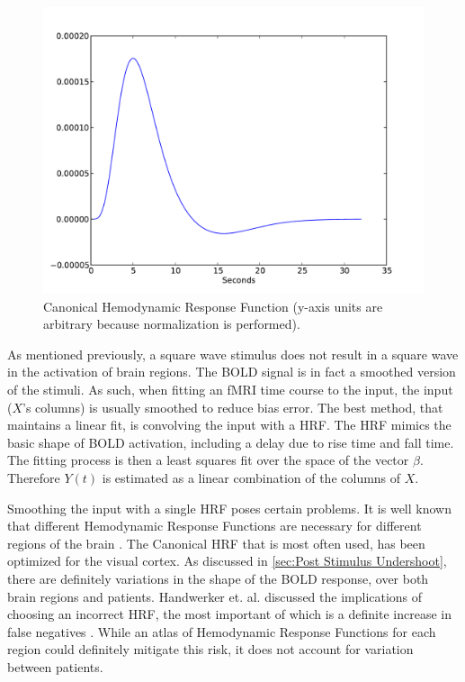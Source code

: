 \begin{figure}
\centering
\includegraphics[scale=.7]{images/HRF}
\caption{Canonical Hemodynamic Response Function (y-axis units are arbitrary because 
normalization is performed).}
\label{fig:HRF}
\end{figure}

As mentioned previously, a square wave stimulus 
does not result in a square wave in the activation of brain regions. 
The \ac{BOLD} signal is in fact a smoothed version of the 
stimuli. As such, when fitting an \ac{fMRI} time course to the input,
the input ($X$'s columns) is usually smoothed to reduce bias error. 
The best method, that maintains a linear fit, is convolving the input 
with a \ac{HRF}. The \ac{HRF}
mimics the basic shape of \ac{BOLD} activation, including a delay
due to rise time and fall time. The fitting 
process is then a least squares fit over the space of the vector $\beta$. 
Therefore $Y(t)$ is estimated as a linear combination 
of the columns of $X$. 

Smoothing the input with a single \ac{HRF} poses certain problems.
It is well known that different Hemodynamic Response Functions are necessary 
for different regions of the brain \cite{Handwerker2004}. The Canonical 
\ac{HRF} that is most often used, 
has been optimized for the visual cortex. As discussed in \autoref{sec:Post Stimulus Undershoot},
there are definitely variations in the shape of the
\ac{BOLD} response, over both brain regions and patients. Handwerker et. al. 
discussed the implications of choosing an incorrect \ac{HRF}, the most important
of which is a definite increase in false negatives \cite{Handwerker2004}. While an atlas
of Hemodynamic Response Functions for each region could definitely 
mitigate this risk, it does not account for variation between patients.

